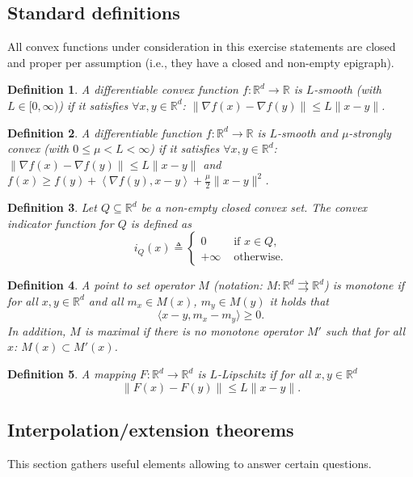 \documentclass[11pt,a4paper]{article}
\newcommand{\inner}[2]{{\langle #1, #2\rangle}}
\newtheorem{definition}{Definition}
\begin{document}
	\subsection{Standard definitions}
	All convex functions under consideration in this exercise statements are closed and proper per assumption (i.e., they have a closed and non-empty epigraph).
	\begin{definition}\label{def:smoothconvex}
	A differentiable convex function $f:\mathbb{R}^d\rightarrow \mathbb{R}$ is $L$-smooth (with $L\in [0,\infty)$) if it satisfies $\forall x,y\in\mathbb{R}^d$: $\|\nabla f(x)-\nabla f(y)\|\leqslant L \|x-y\|$.
	\end{definition}
	\begin{definition}\label{def:smoothstronglyconvex}
	A differentiable function $f:\mathbb{R}^d\rightarrow \mathbb{R}$ is $L$-smooth and $\mu$-strongly convex (with $0\leqslant \mu<L<\infty$) if it satisfies $\forall x,y\in\mathbb{R}^d$: $\|\nabla f(x)-\nabla f(y)\|\leqslant L \|x-y\|$ and $f(x) \geqslant f(y) + \left< \nabla f(y), x - y \right> + \frac{\mu}{2} \|x-y\|^2$.
	\end{definition}
	\begin{definition}\label{def:indicator}
	Let $Q\subseteq \mathbb{R}^d$ be a non-empty closed convex set. The convex indicator function for $Q$ is defined as 
	\[ i_Q(x) \triangleq \left\{\begin{array}{ll}0 &\text{ if }x\in Q,\\+\infty &\text{ otherwise.}\end{array}\right. \]
	\end{definition}
	\begin{definition}\label{def:monotone}
	A point to set operator $M$ (notation: $M:\mathbb{R}^d\rightrightarrows\mathbb{R}^d$) is monotone if for all $x,y\in\mathbb{R}^d$ and all $m_x\in M(x)$, $m_y\in M(y)$ it holds that
	\[ \inner{ x-y}{m_x-m_y}\geqslant 0.\]
In addition, $M$ is maximal if there is no monotone operator $M'$ such that for all $x$: $M(x)\subset M'(x)$.
	\end{definition}
	\begin{definition}\label{def:Lipschitz}
	A mapping $F:\mathbb{R}^d\rightarrow\mathbb{R}^d$ is $L$-Lipschitz if for all $x,y\in\mathbb{R}^d$ 
	\[ \|F(x)-F(y)\|\leqslant L\|x-y\|.\]
	\end{definition}
	
	\subsection{Interpolation/extension theorems}
	This section gathers useful elements allowing to answer certain questions.
\end{document}
